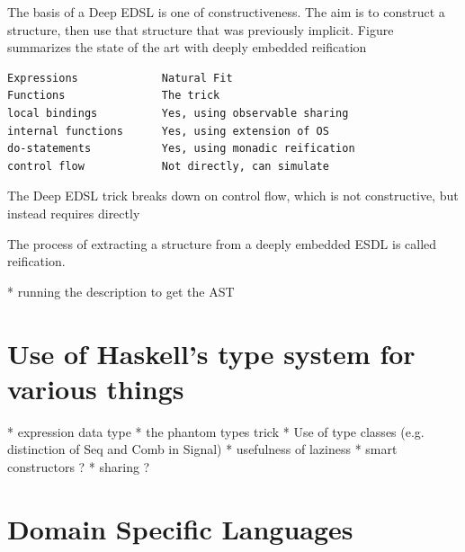 \documentclass[11pt]{article}
\begin{document}
The basis of a Deep EDSL is one of constructiveness.
The aim is to construct a structure, then
use that structure that was previously implicit.
Figure summarizes the state of the art with
deeply embedded reification

\begin{verbatim}
Expressions             Natural Fit
Functions               The trick
local bindings          Yes, using observable sharing
internal functions      Yes, using extension of OS
do-statements           Yes, using monadic reification
control flow            Not directly, can simulate
\end{verbatim}

The Deep EDSL trick breaks down on control flow,
which is not constructive, but instead requires
directly 

The process of extracting a structure from a deeply embedded ESDL
is called reification. 

 * running the description to get the AST 

\section{Use of Haskell’s type system for various things }

 * expression data type 
 * the phantom types trick 
 * Use of type classes (e.g. distinction of Seq and Comb in Signal) 
 * usefulness of laziness 
 * smart constructors ? 
 * sharing ?



\section{Domain Specific Languages}
\end{document}
